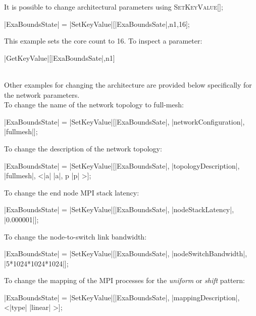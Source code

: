 It is possible to change architectural parameters using \textsc{SetKeyValue[]};
\begin{mma}
  \In |ExaBoundsState| = |SetKeyValue|[|ExaBoundsSate|,n1,16]; \\
\end{mma}
This example sets the core count to 16. To inspect a parameter:
\begin{mma}
  \In |GetKeyValue|[|ExaBoundsSate|,n1] \\
   \\
\end{mma}
Other examples for changing the architecture are provided below specifically for the network parameters. \\

To change the name of the network topology to full-mesh:
\begin{mma}
	\In |ExaBoundsState| = |SetKeyValue|[|ExaBoundsSate|, \linebreak {}|networkConfiguration|, |full\mathtt{-}mesh|]; \\
\end{mma}
To change the description of the network topology:
\begin{mma}
	\In |ExaBoundsState| = |SetKeyValue|[|ExaBoundsSate|, \linebreak {}|topologyDescription|, |full\mathtt{-}mesh|, 
	<|a| \rightarrow  |a|,  p \rightarrow |p| \mathtt{\mid}>]; \\
\end{mma}
To change the end node MPI stack latency:
\begin{mma}
	\In |ExaBoundsState| = |SetKeyValue|[|ExaBoundsSate|, \linebreak {}|nodeStackLatency|, |0.000001|]; \\
\end{mma}
To change the node-to-switch link bandwidth:
\begin{mma}
	\In |ExaBoundsState| = |SetKeyValue|[|ExaBoundsSate|, \linebreak {}|nodeSwitchBandwidth|, |5*1024*1024*1024|]; \\
\end{mma}
To change the mapping of the MPI processes for the \textit{uniform} or \textit{shift} pattern:
\begin{mma}
	\In |ExaBoundsState| = |SetKeyValue|[|ExaBoundsSate|, \linebreak {}|mappingDescription|, <|type| \rightarrow  {}|linear| \mathtt{\mid}>]; \\
\end{mma}
